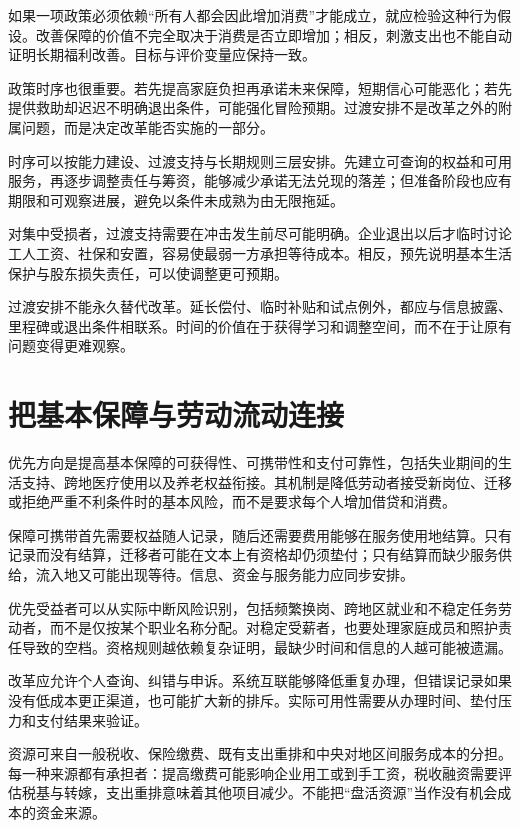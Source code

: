 \documentclass[UTF8,fontset=fandol,zihao=-4,oneside,openany]{ctexbook}
\begin{document}
如果一项政策必须依赖“所有人都会因此增加消费”才能成立，就应检验这种行为假设。改善保障的价值不完全取决于消费是否立即增加；相反，刺激支出也不能自动证明长期福利改善。目标与评价变量应保持一致。

政策时序也很重要。若先提高家庭负担再承诺未来保障，短期信心可能恶化；若先提供救助却迟迟不明确退出条件，可能强化冒险预期。过渡安排不是改革之外的附属问题，而是决定改革能否实施的一部分。

\label{arg:P249}
时序可以按能力建设、过渡支持与长期规则三层安排。先建立可查询的权益和可用服务，再逐步调整责任与筹资，能够减少承诺无法兑现的落差；但准备阶段也应有期限和可观察进展，避免以条件未成熟为由无限拖延。

对集中受损者，过渡支持需要在冲击发生前尽可能明确。企业退出以后才临时讨论工人工资、社保和安置，容易使最弱一方承担等待成本。相反，预先说明基本生活保护与股东损失责任，可以使调整更可预期。

过渡安排不能永久替代改革。延长偿付、临时补贴和试点例外，都应与信息披露、里程碑或退出条件相联系。时间的价值在于获得学习和调整空间，而不在于让原有问题变得更难观察。

\section{把基本保障与劳动流动连接}
优先方向是提高基本保障的可获得性、可携带性和支付可靠性，包括失业期间的生活支持、跨地医疗使用以及养老权益衔接。其机制是降低劳动者接受新岗位、迁移或拒绝严重不利条件时的基本风险，而不是要求每个人增加借贷和消费。

\label{arg:P250}
保障可携带首先需要权益随人记录，随后还需要费用能够在服务使用地结算。只有记录而没有结算，迁移者可能在文本上有资格却仍须垫付；只有结算而缺少服务供给，流入地又可能出现等待。信息、资金与服务能力应同步安排。

优先受益者可以从实际中断风险识别，包括频繁换岗、跨地区就业和不稳定任务劳动者，而不是仅按某个职业名称分配。对稳定受薪者，也要处理家庭成员和照护责任导致的空档。资格规则越依赖复杂证明，最缺少时间和信息的人越可能被遗漏。

改革应允许个人查询、纠错与申诉。系统互联能够降低重复办理，但错误记录如果没有低成本更正渠道，也可能扩大新的排斥。实际可用性需要从办理时间、垫付压力和支付结果来验证。

资源可来自一般税收、保险缴费、既有支出重排和中央对地区间服务成本的分担。每一种来源都有承担者：提高缴费可能影响企业用工或到手工资，税收融资需要评估税基与转嫁，支出重排意味着其他项目减少。不能把“盘活资源”当作没有机会成本的资金来源。
\end{document}
